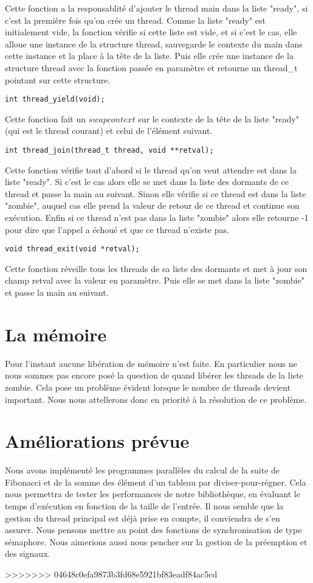 \documentclass[12pt]{article}
\begin{document}
Cette fonction a la responsablité d'ajouter le thread main dans la
liste "ready", si c'est la première fois qu'on crée un thread.  Comme
la liste "ready" est initialement vide, la fonction vérifie si cette
liste est vide, et si c'est le cas, elle alloue une instance de la
structure thread, sauvegarde le contexte du main dans cette instance
et la place à la tête de la liste.  Puis elle crée une instance de la
structure thread avec la fonction passée en paramètre et retourne un
thread\_t pointant sur cette structure.  ~~\\
\begin{verbatim}
int thread_yield(void);
\end{verbatim}
Cette fonction fait un $swapcontext$ sur le contexte de la tête de la
liste "ready" (qui est le thread courant) et celui de l'élément
suivant.  ~~\\
\begin{verbatim}
int thread_join(thread_t thread, void **retval);
\end{verbatim}
Cette fonction vérifie tout d'abord si le thread qu'on veut attendre
est dans la liste "ready". Si c'est le cas alors elle se met dans la
liste des dormants de ce thread et passe la main au suivant.  Sinon
elle vérifie si ce thread est dans la liste "zombie", auquel cas 
elle prend la valeur de retour de ce thread et continue son exécution.
Enfin si ce thread n'est pas dans la liste "zombie" alors elle
retourne -1 pour dire que l'appel a échoué et que ce thread n'existe
pas.  ~~\\
\begin{verbatim}
void thread_exit(void *retval);
\end{verbatim}
Cette fonction réveille tous les threads de sa liste des dormants et
met à jour son champ retval avec la valeur en paramètre. Puis elle se
met dans la liste "zombie" et passe la main au suivant.

\section{La mémoire}
Pour l'instant aucune libération de mémoire n'est faite. En
particulier nous ne nous sommes pas encore posé la question de quand
libérer les threads de la liste zombie. Cela pose un problème
évident lorsque le nombre de threads devient important. Nous nous
attellerons donc en priorité à la résolution de ce problème.

\section{Améliorations prévue}
Nous avons implémenté les programmes parallèles du calcul de la suite
de Fibonacci et de la somme des élément d'un tableau par
diviser-pour-régner. Cela nous permettra de tester les performances de
notre bibliothèque, en évaluant le temps d'exécution en fonction de la
taille de l'entrée. Il nous semble que la gestion du thread principal
est déjà prise en compte, il conviendra de s'en assurer. Nous pensons
mettre au point des fonctions de synchronisation de type
sémaphore. Nous aimerions aussi nous pencher sur la gestion de la
préemption et des signaux.


>>>>>>> 04648c0efa9873b3fd68e5921bf83eadf84ac5cd
\end{document}
